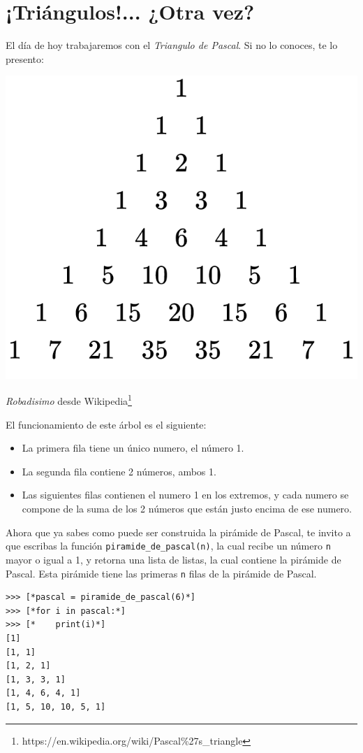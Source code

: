 \section{¡Triángulos!... ¿Otra vez?}

El día de hoy trabajaremos con el \textit{Triangulo de Pascal}. Si no lo conoces, te lo presento:

\begin{center}
\includegraphics[scale=0.5]{Imagenes/pascal}

\textit{Robadisimo} desde Wikipedia\texttrademark\footnote{https://en.wikipedia.org/wiki/Pascal\%27s\_triangle}
\end{center}

El funcionamiento de este árbol es el siguiente:
\begin{itemize}
    \item La primera fila tiene un único numero, el número 1.
    \item La segunda fila contiene 2 números, ambos 1.
    \item Las siguientes filas contienen el numero 1 en los extremos, y cada numero se compone de la suma de los 2 números que están justo encima de ese numero.
\end{itemize}

Ahora que ya sabes como puede ser construida la pirámide de Pascal, te invito a que escribas la función \texttt{piramide\_de\_pascal(n)}, la cual recibe un número \texttt{n} mayor o igual a 1, y retorna una lista de listas, la cual contiene la pirámide de Pascal. Esta pirámide tiene las primeras \texttt{n} filas de la pirámide de Pascal.

\begin{lstlisting}[style=consola]
>>> [*pascal = piramide_de_pascal(6)*]
>>> [*for i in pascal:*]
>>> [*    print(i)*]
[1]
[1, 1]
[1, 2, 1]
[1, 3, 3, 1]
[1, 4, 6, 4, 1]
[1, 5, 10, 10, 5, 1]
\end{lstlisting}

